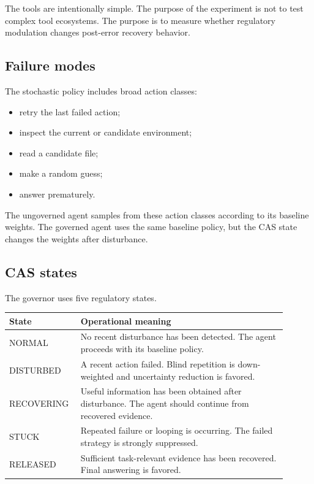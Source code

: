 \documentclass[11pt]{article}
\begin{document}
The tools are intentionally simple. The purpose of the experiment is not to test complex tool ecosystems. The purpose is to measure whether regulatory modulation changes post-error recovery behavior.

\subsection{Failure modes}

The stochastic policy includes broad action classes:

\begin{itemize}[leftmargin=1.5em]
    \item retry the last failed action;
    \item inspect the current or candidate environment;
    \item read a candidate file;
    \item make a random guess;
    \item answer prematurely.
\end{itemize}

The ungoverned agent samples from these action classes according to its baseline weights. The governed agent uses the same baseline policy, but the CAS state changes the weights after disturbance.

\subsection{CAS states}

The governor uses five regulatory states.

\begin{center}
\begin{tabular}{p{0.20\linewidth} p{0.70\linewidth}}
\toprule
\textbf{State} & \textbf{Operational meaning} \\
\midrule
NORMAL & No recent disturbance has been detected. The agent proceeds with its baseline policy. \\
DISTURBED & A recent action failed. Blind repetition is down-weighted and uncertainty reduction is favored. \\
RECOVERING & Useful information has been obtained after disturbance. The agent should continue from recovered evidence. \\
STUCK & Repeated failure or looping is occurring. The failed strategy is strongly suppressed. \\
RELEASED & Sufficient task-relevant evidence has been recovered. Final answering is favored. \\
\bottomrule
\end{tabular}
\end{center}
\end{document}
